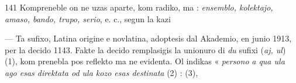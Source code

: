 \begin{VUpage}[145]{141}
Kompreneble on ne uzas  aparte, kom radiko, ma :\nl
\textit{ensemblo, kolektajo, amaso, bando, trupo, serio}, e. c., segun\nl
la kazi

 --- Ta sufixo, Latina origine e novlatina, adoptesis\nl
dal Akademio, en junio 1913, per la decido 1143. Fakte la\nl
decido remplasigis la unionuro di \textit{du} sufixi (\textit{aj, ul}) (1), kom\cc
prenebla pos reflekto ma ne evidenta. Ol indikas « \textit{persono}\nl
\textit{a qua ula ago esas direktata od ula kozo esas destinata} (2) :\nl
{} (3), \parplein
\end{VUpage}

